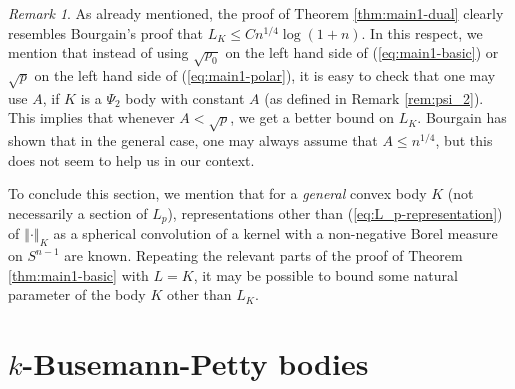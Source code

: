 \documentclass[12pt,oneside]{amsart}
\theoremstyle{definition}
\theoremstyle{remark}
\newtheorem{rem}[thm]{Remark}
\theoremstyle{proof}
\numberwithin{equation}{section}
\newcommand{\norm}[1]{\left\Vert#1\right\Vert}
\begin{document}
\begin{rem}
As already mentioned, the proof of Theorem \ref{thm:main1-dual}
clearly resembles Bourgain's proof that $L_K \leq C n^{1/4}
\log(1+n)$. In this respect, we mention that instead of using
$\sqrt{p_0}$ on the left hand side of (\ref{eq:main1-basic}) or
$\sqrt{p}$ on the left hand side of (\ref{eq:main1-polar}), it is
easy to check that one may use $A$, if $K$ is a $\Psi_2$ body with
constant $A$ (as defined in Remark \ref{rem:psi_2}). This implies
that whenever $A < \sqrt{p}$, we get a better bound on $L_K$.
Bourgain has shown that in the general case, one may always
assume that $A \leq n^{1/4}$, but this does not seem to help us in
our context.
\end{rem}


\medskip

To conclude this section, we mention that for a \emph{general}
convex body $K$ (not necessarily a section of $L_p$),
representations other than (\ref{eq:L_p-representation}) of
$\norm{\cdot}_K$ as a spherical convolution of a kernel with a
non-negative Borel measure on $S^{n-1}$ are known. Repeating the
relevant parts of the proof of Theorem \ref{thm:main1-basic} with
$L=K$, it may be possible to bound some natural parameter of the
body $K$ other than $L_K$.




\section{$k$-Busemann-Petty bodies} \label{sec:k-BP-bodies}
\end{document}

